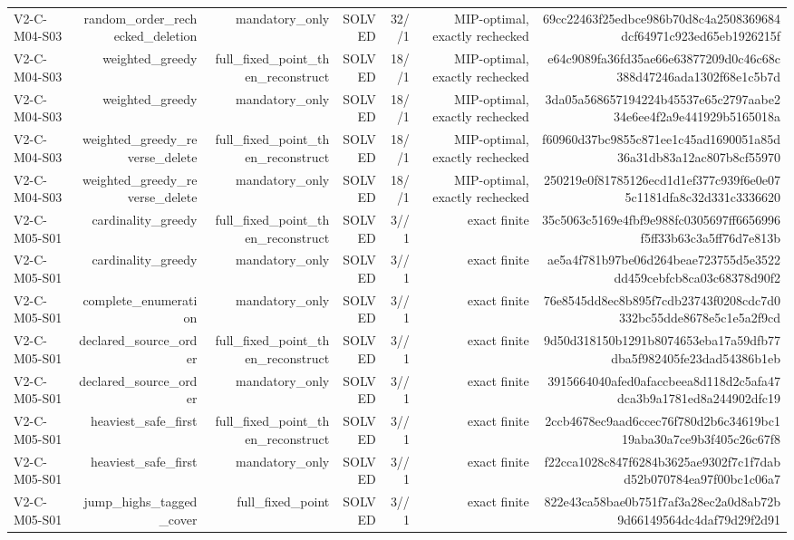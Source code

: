{\begin{longtable}{lrrrrrr}
V2-C-M04-S03 & random\_order\_rechecked\_deletion & mandatory\_only & SOLVED & 32//1 & MIP-optimal, exactly rechecked & 69cc22463f25edbce986b70d8c4a2508369684dcf64971c923ed65eb1926215f \\
V2-C-M04-S03 & weighted\_greedy & full\_fixed\_point\_then\_reconstruct & SOLVED & 18//1 & MIP-optimal, exactly rechecked & e64c9089fa36fd35ae66e63877209d0c46c68c388d47246ada1302f68e1c5b7d \\
V2-C-M04-S03 & weighted\_greedy & mandatory\_only & SOLVED & 18//1 & MIP-optimal, exactly rechecked & 3da05a568657194224b45537e65c2797aabe234e6ee4f2a9e441929b5165018a \\
V2-C-M04-S03 & weighted\_greedy\_reverse\_delete & full\_fixed\_point\_then\_reconstruct & SOLVED & 18//1 & MIP-optimal, exactly rechecked & f60960d37bc9855c871ee1c45ad1690051a85d36a31db83a12ac807b8cf55970 \\
V2-C-M04-S03 & weighted\_greedy\_reverse\_delete & mandatory\_only & SOLVED & 18//1 & MIP-optimal, exactly rechecked & 250219e0f81785126ecd1d1ef377c939f6e0e075c1181dfa8c32d331c3336620 \\
V2-C-M05-S01 & cardinality\_greedy & full\_fixed\_point\_then\_reconstruct & SOLVED & 3//1 & exact finite & 35c5063c5169e4fbf9e988fc0305697ff6656996f5ff33b63c3a5ff76d7e813b \\
V2-C-M05-S01 & cardinality\_greedy & mandatory\_only & SOLVED & 3//1 & exact finite & ae5a4f781b97be06d264beae723755d5e3522dd459cebfcb8ca03c68378d90f2 \\
V2-C-M05-S01 & complete\_enumeration & mandatory\_only & SOLVED & 3//1 & exact finite & 76e8545dd8ec8b895f7cdb23743f0208cdc7d0332bc55dde8678e5c1e5a2f9cd \\
V2-C-M05-S01 & declared\_source\_order & full\_fixed\_point\_then\_reconstruct & SOLVED & 3//1 & exact finite & 9d50d318150b1291b8074653eba17a59dfb77dba5f982405fe23dad54386b1eb \\
V2-C-M05-S01 & declared\_source\_order & mandatory\_only & SOLVED & 3//1 & exact finite & 3915664040afed0afaccbeea8d118d2c5afa47dca3b9a1781ed8a244902dfc19 \\
V2-C-M05-S01 & heaviest\_safe\_first & full\_fixed\_point\_then\_reconstruct & SOLVED & 3//1 & exact finite & 2ccb4678ec9aad6ccec76f780d2b6c34619bc119aba30a7ce9b3f405c26c67f8 \\
V2-C-M05-S01 & heaviest\_safe\_first & mandatory\_only & SOLVED & 3//1 & exact finite & f22cca1028c847f6284b3625ae9302f7c1f7dabd52b070784ea97f00bc1c06a7 \\
V2-C-M05-S01 & jump\_highs\_tagged\_cover & full\_fixed\_point & SOLVED & 3//1 & exact finite & 822e43ca58bae0b751f7af3a28ec2a0d8ab72b9d66149564dc4daf79d29f2d91 \\

\end{longtable}}
